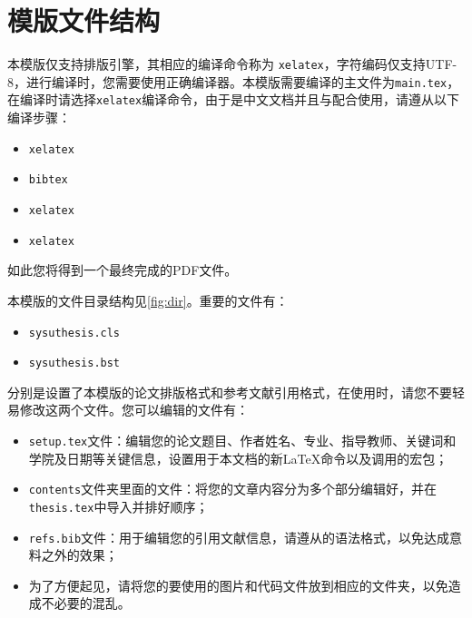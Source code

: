 \section{模版文件结构}

本模版仅支持排版引擎，其相应的编译命令称为 \texttt{xelatex}，字符编码仅支持UTF-8，进行编译时，您需要使用正确编译器。本模版需要编译的主文件为\texttt{main.tex}，在编译时请选择\texttt{xelatex}编译命令，由于是中文文档并且与配合使用，请遵从以下编译步骤：
\begin{itemize}
    \item \texttt{xelatex}
    \item \texttt{bibtex}
    \item \texttt{xelatex}
    \item \texttt{xelatex}
\end{itemize}
如此您将得到一个最终完成的PDF文件。

本模版的文件目录结构见\ref{fig:dir}。重要的文件有：
\begin{itemize}
    \item \texttt{sysuthesis.cls}
    \item \texttt{sysuthesis.bst}
\end{itemize}
分别是设置了本模版的论文排版格式和参考文献引用格式，在使用时，请您不要轻易修改这两个文件。您可以编辑的文件有：
\begin{itemize}
    \item \texttt{setup.tex}文件：编辑您的论文题目、作者姓名、专业、指导教师、关键词和学院及日期等关键信息，设置用于本文档的新\LaTeX{}命令以及调用的宏包；
    \item \texttt{contents}文件夹里面的文件：将您的文章内容分为多个部分编辑好，并在\texttt{thesis.tex}中导入并排好顺序；
    \item \texttt{refs.bib}文件：用于编辑您的引用文献信息，请遵从的语法格式，以免达成意料之外的效果；
    \item 为了方便起见，请将您的要使用的图片和代码文件放到相应的文件夹，以免造成不必要的混乱。
\end{itemize}

